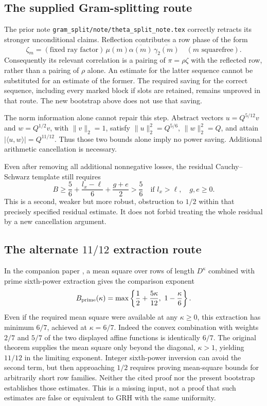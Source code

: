 \documentclass[11pt]{article}
\begin{document}
\subsection*{The supplied Gram-splitting route}
The prior note \nolinkurl{gram_split/note/theta_split_note.tex} correctly
retracts its stronger unconditional claims. Reflection contributes a
row phase of the form
\[
 \zeta_m=(\text{fixed ray factor})\,
 \mu(m)\overline{\alpha(m)}\,\overline{\gamma_2(m)}
 \quad(m\text{ squarefree}).
\]
Consequently its relevant correlation is a pairing of $\pi=\rho\zeta$
with the reflected row, rather than a pairing of $\rho$ alone. An estimate
for the latter sequence cannot be substituted for an estimate of the
former. The required saving for the correct sequence, including every
marked block if slots are retained, remains unproved in that route.
The new bootstrap above does not use that saving.

The norm information alone cannot repair this step. Abstract vectors
$u=Q^{5/12}v$ and $w=Q^{1/2}v$, with $\|v\|_2=1$, satisfy
$\|u\|_2^2=Q^{5/6}$, $\|w\|_2^2=Q$, and attain
$|\langle u,w\rangle|=Q^{11/12}$. Thus those two bounds alone imply
no power saving. Additional arithmetic cancellation is necessary.

Even after removing all additional nonnegative losses, the residual
Cauchy--Schwarz template still requires
\[
 B\ge\frac56+\frac{l_x-\ell}{6}+\frac{g+e}{2}>\frac56
 \quad\text{if }l_x>\ell,\quad g,e\ge0.
\]
This is a second, weaker but more robust, obstruction to $1/2$ within
that precisely specified residual estimate. It does not forbid treating
the whole residual by a new cancellation argument.

\subsection*{The alternate $11/12$ extraction route}
In the companion paper \cite{alternate}, a mean square over rows of
length $D^\kappa$ combined with prime sixth-power extraction gives the
comparison exponent
\[
 B_{\rm prime}(\kappa)
 =\max\left\{\frac12+\frac{5\kappa}{12},\ 1-\frac\kappa6\right\}.
\]
Even if the required mean square were available at any $\kappa\ge0$,
this extraction has minimum $6/7$, achieved at $\kappa=6/7$.
Indeed the convex combination with weights $2/7$ and $5/7$ of the
two displayed affine functions is identically $6/7$.
The original theorem supplies the mean square only beyond the diagonal,
$\kappa>1$, yielding $11/12$ in the limiting exponent.
Integer sixth-power inversion can avoid the second term, but then
approaching $1/2$ requires proving mean-square bounds for arbitrarily
short row families. Neither the cited proof nor the present bootstrap
establishes those estimates. This is a missing input, not a proof that
such estimates are false or equivalent to GRH with the same uniformity.
\end{document}
